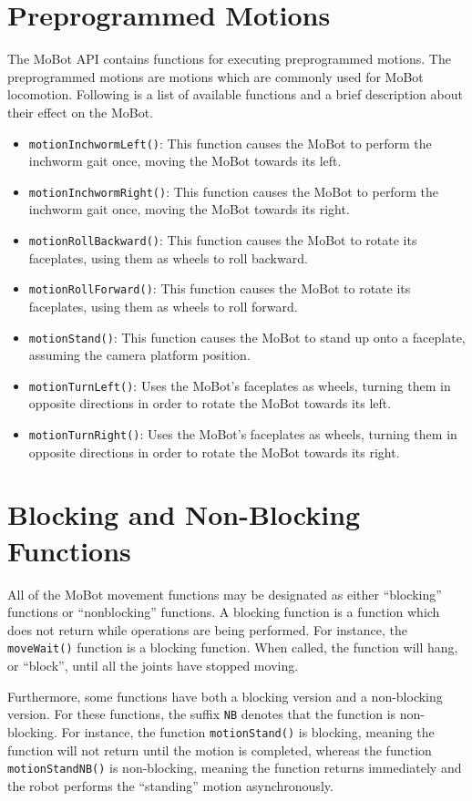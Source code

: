 \documentclass{article}
\begin{document}
\section{Preprogrammed Motions}
The MoBot API contains functions for executing preprogrammed motions. The 
preprogrammed motions are motions which are commonly used for MoBot locomotion.
Following is a list of available functions and a brief description about
their effect on the MoBot.
\begin{itemize}
\item \texttt{motionInchwormLeft()}: This function causes the MoBot to perform
  the inchworm gait once, moving the MoBot towards its left.
\item \texttt{motionInchwormRight()}: This function causes the MoBot to perform
  the inchworm gait once, moving the MoBot towards its right.
\item \texttt{motionRollBackward()}: This function causes the MoBot to rotate
  its faceplates, using them as wheels to roll backward.
\item \texttt{motionRollForward()}: This function causes the MoBot to rotate
  its faceplates, using them as wheels to roll forward.
\item \texttt{motionStand()}: This function causes the MoBot to stand up onto a 
  faceplate, assuming the camera platform position.
\item \texttt{motionTurnLeft()}: Uses the MoBot's faceplates as wheels, turning
  them in opposite directions in order to rotate the MoBot towards its left.
\item \texttt{motionTurnRight()}: Uses the MoBot's faceplates as wheels, turning
  them in opposite directions in order to rotate the MoBot towards its right.
\end{itemize}

\section{Blocking and Non-Blocking Functions}
All of the MoBot movement functions may be designated as either ``blocking'' 
functions or ``nonblocking'' functions. A blocking function is a function which
does not return while operations are being performed. For instance, the
\texttt{moveWait()} function is a blocking function. When called, the function
will hang, or ``block'', until all the joints have stopped moving.

Furthermore, some functions have both a blocking version and a non-blocking
version. For these functions, the suffix \texttt{NB} denotes that the function
is non-blocking. For instance, the function \texttt{motionStand()} is blocking,
meaning the function will not return until the motion is completed, whereas
the function \texttt{motionStandNB()} is non-blocking, meaning the function
returns immediately and the robot performs the ``standing'' motion
asynchronously.
\end{document}
